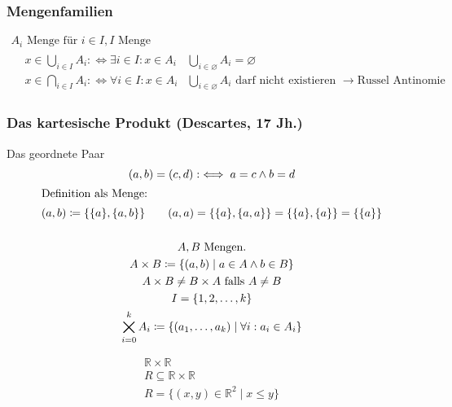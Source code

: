 \subsubsection{Mengenfamilien}
\begin{gather*}
	A_i \text{ Menge für } i \in I , I \text{ Menge} \\
	\begin{aligned}
	& x \in \bigcup_{i \in I} A_i :\iff \exists i \in I : x \in A_i 		& \bigcup_{i \in \varnothing} A_i = \varnothing \\
	& x \in \bigcap_{i \in I} A_i :\iff \forall i \in I : x \in A_i 		& \bigcup_{i \in \varnothing} A_i \text{ darf nicht existieren } \rightarrow \text{Russel Antinomie}
	\end{aligned}
\end{gather*}

\subsubsection{Das kartesische Produkt (Descartes, 17 Jh.)}
Das geordnete Paar
\begin{gather*}
	(a , b) = (c , d) :\iff a = c \wedge b = d \\
	\intertext{Definition als Menge:}
	(a , b) \coloneqq \{ \{ a \} , \{ a , b \} \} \qquad (a , a) = \{ \{ a \} , \{ a , a \} \} = \{ \{ a \} , \{ a \} \} = \{ \{ a \} \}\\
	\\
	A , B \text{ Mengen.} \\
	A \times B \coloneqq \{ (a , b) \mid a \in A \wedge b \in B \} \\
	A \times B \neq B \times A \text{ falls } A \neq B \\
	I = \{ 1 , 2 , \dotsc , k \} \\
	\bigtimes_{i=0}^k A_i \coloneqq \{ (a_1 , \dotsc , a_k ) \mid \forall i : a_i \in A_i \}
\end{gather*}
\begin{bsp*}
	\begin{gather*}
		\mathbb{R} \times \mathbb{R} \\
		R \subseteq \mathbb{R} \times \mathbb{R} \\
		R = \{ (x , y) \in \mathbb{R}^2 \mid x \leq y \}
	\end{gather*}
\end{bsp*}
